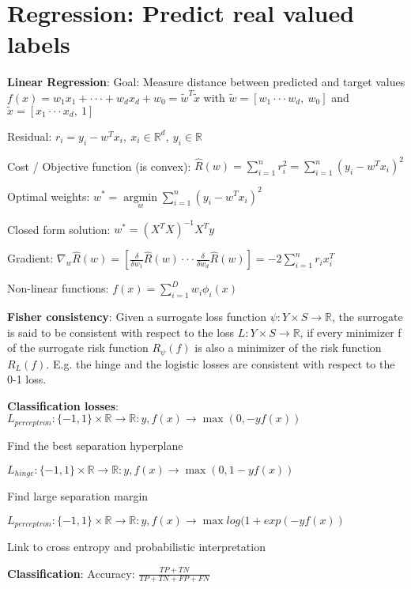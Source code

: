 \section{Regression: Predict real valued labels}
\textbf{Linear Regression}: Goal: Measure distance between predicted and target values
$f(x) = w_1 x_1 + \cdot \cdot \cdot + w_d x_d + w_0 = \widetilde{w}^T \widetilde{x}$ with
$\widetilde{w} = [w_1 \cdot \cdot \cdot w_d,\ w_0 ]$ and $\widetilde{x} = [x_1 \cdot \cdot \cdot x_d,\ 1]$

Residual: $r_i = y_i - w^T x_i,\ x_i \in \mathbb{R}^d,\ y_i \in \mathbb{R}$

Cost / Objective function (is convex): $\hat{R}(w) = \sum_{i=1}^n r_i^2 =  \sum_{i=1}^n (y_i - w^T x_i)^2$

Optimal weights: $w^* = \underset{w}{\operatorname{argmin}} \sum_{i=1}^n (y_i - w^T x_i)^2$

Closed form solution: $w^*=(X^T X)^{-1} X^T y$

Gradient: $\nabla_w \hat{R}(w) = [\frac{\delta}{\delta w_1} \hat{R}(w) \cdot \cdot \cdot \frac{\delta}{\delta w_d} \hat{R}(w)] =  -2 \sum_{i=1}^n r_i x_i^T$

Non-linear functions: $f(x) = \sum_{i=1}^D w_i \phi_i(x)$

\textbf{Fisher consistency}: Given a surrogate loss function $\psi : Y \times S \rightarrow \mathbb{R}$, the surrogate is said to be consistent with respect to the loss $L : Y \times S \rightarrow \mathbb{R}$, if every minimizer f of the surrogate risk function $R_{\psi}(f)$ is also a minimizer of the risk function $R_L (f)$. E.g. the hinge and the logistic losses are consistent with respect to the 0-1 loss.

\textbf{Classification losses}: $L_{perceptron}: \{ -1, 1 \} \times \mathbb{R} \rightarrow \mathbb{R}: y, f(x) \rightarrow \operatorname{max} (0, -yf(x))$

Find the best separation hyperplane

$L_{hinge}: \{ -1, 1 \} \times \mathbb{R} \rightarrow \mathbb{R}: y, f(x) \rightarrow \operatorname{max} (0, 1-yf(x))$

Find large separation margin

$L_{perceptron}: \{ -1, 1 \} \times \mathbb{R} \rightarrow \mathbb{R}: y, f(x) \rightarrow \operatorname{max} log(1 + exp(-yf(x))$

Link to cross entropy and probabilistic interpretation

\textbf{Classification}: Accuracy: $\frac{TP + TN}{TP + TN + FP + FN}$

